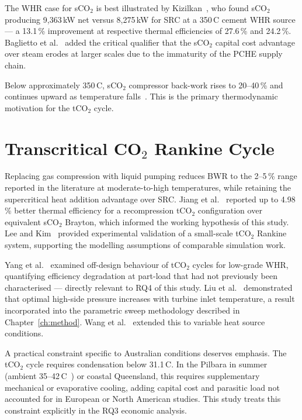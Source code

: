 The WHR case for sCO$_2$ is best illustrated by Kizilkan~\cite{Kizilkan2020},
who found sCO$_2$ producing 9,363\,kW net versus 8,275\,kW for SRC at a
350\,\textdegree C cement WHR source --- a 13.1\,\% improvement at respective
thermal efficiencies of 27.6\,\% and 24.2\,\%. Baglietto et
al.~\cite{Baglietto2023} added the critical qualifier that the sCO$_2$ capital
cost advantage over steam erodes at larger scales due to the immaturity of
the PCHE supply chain.

Below approximately 350\,\textdegree C, sCO$_2$ compressor back-work rises
to 20--40\,\% and continues upward as temperature falls~\cite{Crespi2017}.
This is the primary thermodynamic motivation for the tCO$_2$ cycle.

\section{Transcritical CO$_2$ Rankine Cycle}
\label{sec:lit_tco2}

Replacing gas compression with liquid pumping reduces BWR to the 2--5\,\%
range reported in the literature at moderate-to-high temperatures, while
retaining the supercritical heat addition advantage over SRC. Jiang et
al.~\cite{Jiang2023} reported up to 4.98\,\% better thermal efficiency for a
recompression tCO$_2$ configuration over equivalent sCO$_2$ Brayton, which
informed the working hypothesis of this study. Lee and
Kim~\cite{Lee2023} provided experimental validation of a small-scale tCO$_2$
Rankine system, supporting the modelling assumptions of comparable simulation
work.

Yang et al.~\cite{Yang2024} examined off-design behaviour of tCO$_2$ cycles
for low-grade WHR, quantifying efficiency degradation at part-load that had
not previously been characterised --- directly relevant to RQ4 of this study.
Liu et al.~\cite{Liu2024} demonstrated that optimal high-side pressure
increases with turbine inlet temperature, a result incorporated into the
parametric sweep methodology described in Chapter~\ref{ch:method}. Wang et
al.~\cite{Wang2025} extended this to variable heat source conditions.

A practical constraint specific to Australian conditions deserves emphasis.
The tCO$_2$ cycle requires condensation below 31.1\,\textdegree C. In the
Pilbara in summer (ambient 35--42\,\textdegree C~\cite{BOM2024}) or coastal
Queensland, this requires supplementary mechanical or evaporative cooling,
adding capital cost and parasitic load not accounted for in European or
North American studies. This study treats this constraint explicitly in the
RQ3 economic analysis.

